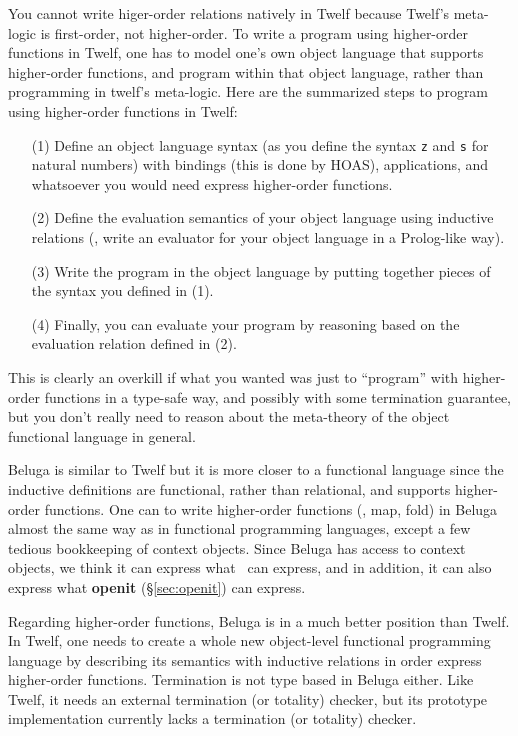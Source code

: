 You cannot write higer-order relations natively in Twelf
because Twelf's meta-logic is first-order, not higher-order.
To write a program using higher-order functions in Twelf, one has to model
one's own object language that supports higher-order functions, and program
within that object language, rather than programming in twelf's meta-logic.
Here are the summarized steps to program using higher-order functions in Twelf:
\begin{itemize}
\item[(1)] Define an object language syntax
(as you define the syntax \texttt{z} and \texttt{s} for natural numbers)
with bindings (this is done by HOAS), applications, and
whatsoever you would need express higher-order functions.
\item[(2)] Define the evaluation semantics of your object language using
        inductive relations (\ie, write an evaluator for
        your object language in a Prolog-like way).
\item[(3)] Write the program in the object language by putting
        together pieces of the syntax you defined in (1).
\item[(4)] Finally, you can evaluate your program by reasoning based on
        the evaluation relation defined in (2).
\end{itemize}
This is clearly an overkill if what you wanted was just to ``program''
with higher-order functions in a type-safe way, and possibly with some
termination guarantee, but you don't really need to reason about
the meta-theory of the object functional language in general.

Beluga \cite{Pie10} is similar to Twelf but it is more closer to
a functional language since the inductive definitions are functional,
rather than relational, and supports higher-order functions. 
One can to write higher-order functions (\eg, map, fold) in Beluga
almost the same way as in functional programming languages, except
a few tedious bookkeeping of context objects. Since Beluga has access
to context objects, we think it can express what \MsfIt\ can express,
and in addition, it can also express what \textbf{openit} (\S\ref{sec:openit})
can express.

Regarding higher-order functions, Beluga is in a much better position
than Twelf. In Twelf, one needs to create a whole new object-level
functional programming language by describing its semantics with
inductive relations in order express higher-order functions.
Termination is not type based in Beluga either. Like Twelf, it needs
an external termination (or totality) checker, but its prototype
implementation currently lacks a termination (or totality) checker.



